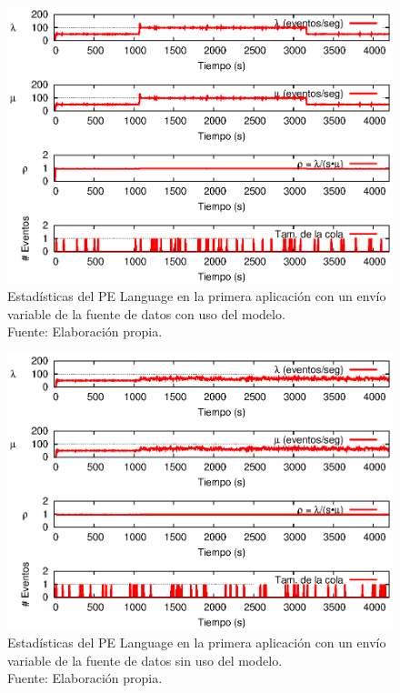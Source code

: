 \begin{figure}[!ht]
    \centering
    \captionsetup{justification=centering}
    \includegraphics[scale=1]{images/exp/app1/normal/cm/statusLanguagePE.eps}
    \caption[Estadísticas del PE Language en la primera aplicación con un envío variable de la fuente de datos con uso del modelo.]{Estadísticas del PE Language en la primera aplicación con un envío variable de la fuente de datos con uso del modelo.\\Fuente: Elaboración propia.}
    \label{fig:app1-normal-statusLanguagePE-cm}
\end{figure}

\begin{figure}[!ht]
    \centering
    \captionsetup{justification=centering}
    \includegraphics[scale=1]{images/exp/app1/normal/sm/statusLanguagePE.eps}
    \caption[Estadísticas del PE Language en la primera aplicación con un envío variable de la fuente de datos sin uso del modelo.]{Estadísticas del PE Language en la primera aplicación con un envío variable de la fuente de datos sin uso del modelo.\\Fuente: Elaboración propia.}
    \label{fig:app1-normal-statusLanguagePE-sm}
\end{figure}


